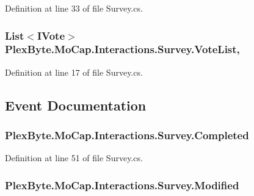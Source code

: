 Definition at line 33 of file Survey.\+cs.

\subsubsection[{\texorpdfstring{Vote\+List}{VoteList}}]{\setlength{\rightskip}{0pt plus 5cm}List$<${\bf I\+Vote}$>$ Plex\+Byte.\+Mo\+Cap.\+Interactions.\+Survey.\+Vote\+List\hspace{0.3cm}{\ttfamily [get]}, {\ttfamily [set]}}\hypertarget{class_plex_byte_1_1_mo_cap_1_1_interactions_1_1_survey_a3527ea8b21abf85da934d6940a97d2ea}{}\label{class_plex_byte_1_1_mo_cap_1_1_interactions_1_1_survey_a3527ea8b21abf85da934d6940a97d2ea}


Definition at line 17 of file Survey.\+cs.



\subsection{Event Documentation}
\subsubsection[{\texorpdfstring{Completed}{Completed}}]{ Plex\+Byte.\+Mo\+Cap.\+Interactions.\+Survey.\+Completed}\hypertarget{class_plex_byte_1_1_mo_cap_1_1_interactions_1_1_survey_a954056f9deb35fc271a4c8932003b832}{}\label{class_plex_byte_1_1_mo_cap_1_1_interactions_1_1_survey_a954056f9deb35fc271a4c8932003b832}


Definition at line 51 of file Survey.\+cs.

\subsubsection[{\texorpdfstring{Modified}{Modified}}]{ Plex\+Byte.\+Mo\+Cap.\+Interactions.\+Survey.\+Modified}\hypertarget{class_plex_byte_1_1_mo_cap_1_1_interactions_1_1_survey_a92a7ef7437f99640fea44765d7453418}{}\label{class_plex_byte_1_1_mo_cap_1_1_interactions_1_1_survey_a92a7ef7437f99640fea44765d7453418}


